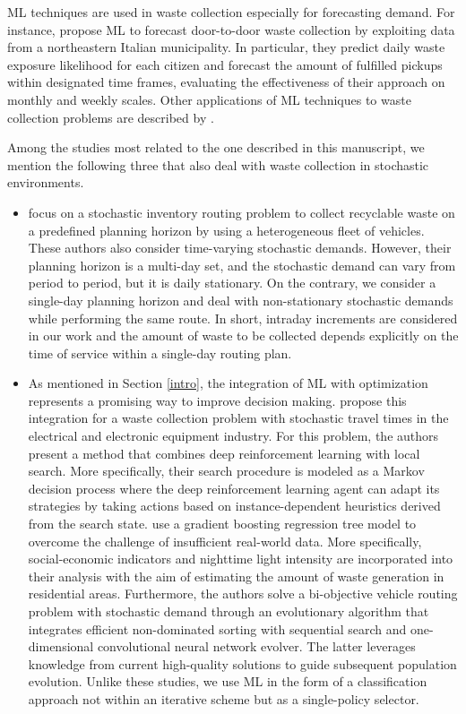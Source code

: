 \documentclass[preprint,11pt,authoryear]{elsarticle}
\begin{document}
ML techniques are used in waste collection especially for forecasting demand. For instance, \cite{Pasa2025} propose ML to forecast door-to-door waste collection by exploiting data from a northeastern Italian municipality. In particular, they predict daily
waste exposure likelihood for each citizen and forecast the amount of fulfilled pickups within designated time frames, evaluating the
effectiveness of their approach on monthly and weekly scales. Other applications of ML techniques to waste collection problems are described by \cite{Xia2022}.



Among the studies most related to the one described in this manuscript, we mention the following three that also deal with waste collection in stochastic environments.
\begin{itemize}
\item \cite{Markov2020} focus on a stochastic inventory routing problem to collect recyclable waste on a predefined planning horizon by using a heterogeneous fleet of vehicles. These authors also consider time-varying stochastic
demands. However, their planning horizon is a multi-day set, and the stochastic demand can vary from period to period, but it is daily stationary. On the contrary, we consider a single-day planning horizon and deal with non-stationary stochastic demands while performing the same route. In short, intraday increments are considered in our work and the amount of waste to be collected depends explicitly on the time of service within a single-day routing plan.
\item As mentioned in Section \ref{intro}, the integration of ML with optimization represents a promising way to improve decision making. \cite{Nguyen2025} propose this integration for a waste collection problem with stochastic travel times in the electrical and electronic equipment industry. For this problem, the authors present a method that combines deep reinforcement learning with local search. More specifically, their search procedure is modeled as a Markov decision process where the deep reinforcement learning agent can adapt its strategies by taking actions based on instance-dependent heuristics derived from the search state. \cite{Liao2025} use a gradient boosting regression tree  model to overcome the challenge of insufficient real-world data. More specifically, social-economic indicators and nighttime light intensity are incorporated into their analysis with the aim of estimating the amount of waste generation in residential areas. Furthermore, the authors solve a bi-objective vehicle routing problem with 
stochastic demand through an evolutionary algorithm that integrates efficient non-dominated sorting with sequential search and one-dimensional convolutional neural network evolver. The latter leverages knowledge from current high-quality solutions to guide subsequent population evolution.
Unlike these studies, we use ML in the form of a classification approach not within an iterative scheme but as a single-policy selector.    
\end{itemize}
\end{document}
